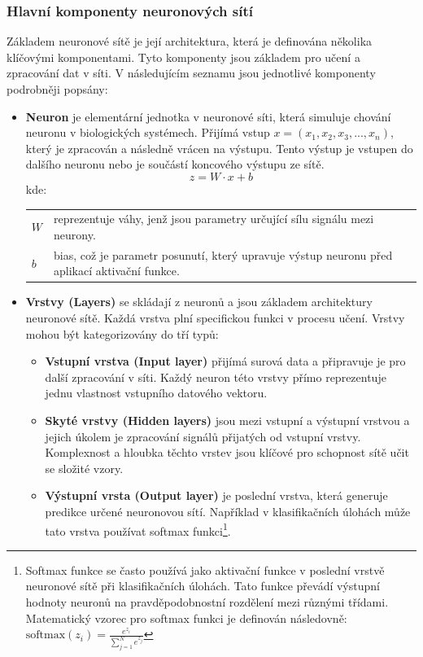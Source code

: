 \documentclass[male,czech,api_ing]{thesis}
\makeatletter
\newenvironment{conditions}[1][kde:]
    {#1 \begin{tabular}[t]{>{$}l<{$} @{${}={}$} >{\raggedright\arraybackslash}p{10cm}}}
    {\end{tabular}}
\makeatother
\begin{document}
\subsubsection{Hlavní komponenty neuronových sítí}
Základem neuronové sítě je její architektura, která je definována několika klíčovými komponentami. Tyto komponenty jsou základem pro učení a zpracování dat v síti. V následujícím seznamu jsou jednotlivé komponenty podrobněji popsány:

\begin{itemize}
    \item \textbf{Neuron} je elementární jednotka v neuronové síti, která simuluje chování neuronu v biologických systémech. Přijímá vstup $x = (x_1, x_2, x_3, ..., x_n)$, který je zpracován a následně vrácen na výstupu. Tento výstup je vstupen do dalšího neuronu nebo je součástí koncového výstupu ze sítě.
        \begin{equation}
            z = W \cdot x + b
        \end{equation}
        \begin{conditions}
            W & reprezentuje váhy, jenž jsou parametry určující sílu signálu mezi neurony. \\
            b & bias, což je parametr posunutí, který upravuje výstup neuronu před aplikací aktivační funkce.
        \end{conditions}
    \item \textbf{Vrstvy (Layers)} se skládají z neuronů a jsou základem architektury neuronové sítě. Každá vrstva plní specifickou funkci v procesu učení. Vrstvy mohou být kategorizovány do tří typů:
        \begin{itemize}
            \item \textbf{Vstupní vrstva (Input layer)} přijímá surová data a připravuje je pro další zpracování v síti. Každý neuron této vrstvy přímo reprezentuje jednu vlastnost vstupního datového vektoru.
            \item \textbf{Skyté vrstvy (Hidden layers)} jsou mezi vstupní a výstupní vrstvou a jejich úkolem je zpracování signálů přijatých od vstupní vrstvy. Komplexnost a hloubka těchto vrstev jsou klíčové pro schopnost sítě učit se složité vzory.
            \item \textbf{Výstupní vrsta (Output layer) } je poslední vrstva, která generuje predikce určené neuronovou sítí. Například v klasifikačních úlohách může tato vrstva používat softmax funkci\footnote{Softmax funkce se často používá jako aktivační funkce v poslední vrstvě neuronové sítě při klasifikačních úlohách. Tato funkce převádí výstupní hodnoty neuronů na pravděpodobnostní rozdělení mezi různými třídami. Matematický vzorec pro softmax funkci je definován následovně: $\text{softmax}(z_i) = \frac{e^{z_i}}{\sum_{j=1}^{N} e^{z_j}}$}.

\end{itemize}
\end{itemize}
\end{document}
